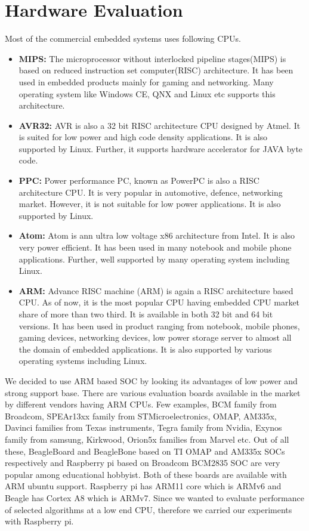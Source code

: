 \section {Hardware Evaluation}
\indent Most of the commercial embedded systems uses following CPUs.
\begin{itemize}
	\item \textbf{MIPS:} The microprocessor without interlocked
		pipeline stages(MIPS) is based on reduced instruction
		set computer(RISC) architecture. It has been used in
		embedded products mainly for gaming and networking. Many
		operating system like Windows CE, QNX and Linux etc
		supports this architecture.
	\item \textbf{AVR32:} AVR is also a 32 bit RISC architecture CPU
		designed by Atmel. It is suited for low power and high
		code density applications.  It is also supported by
		Linux. Further, it supports hardware accelerator for
		JAVA byte code.
	\item \textbf{PPC:} Power performance PC, known as PowerPC is
		also a RISC architecture CPU. It is very popular in
		automotive, defence, networking market. However, it is not
		suitable for low power applications. It is also
		supported by Linux.
	\item \textbf{Atom:} Atom is ann ultra low voltage x86
		architecture from Intel. It is also very power
		efficient. It has been used in many notebook and mobile
		phone applications. Further, well supported by many
		operating system including Linux.
	\item \textbf{ARM:} Advance RISC machine (ARM) is again a RISC
		architecture based CPU. As of now, it is the most
		popular CPU having embedded CPU market share of more
		than two third. It is available in both 32 bit and 64
		bit versions. It has been used in product ranging from
		notebook, mobile phones, gaming devices, networking
		devices, low power storage server to almost all the
		domain of embedded applications. It is also supported by
		various operating systems including Linux.
\end{itemize}
We decided to use ARM based SOC by looking its advantages of low power
and strong support base. There are various evaluation boards available
in the market by different vendors having ARM CPUs. Few examples, BCM
family from Broadcom, SPEAr13xx family from STMicroelectronics, OMAP,
AM335x, Davinci families from Texas instruments, Tegra family from
Nvidia, Exynos family from samsung, Kirkwood, Orion5x families from
Marvel etc. Out of all these, BeagleBoard and BeagleBone based on TI
OMAP and AM335x SOCs respectively and Raspberry pi based on Broadcom
BCM2835 SOC are very popular among educational hobbyist. Both of these
boards are available with ARM ubuntu support. Raspberry pi has ARM11
core which is ARMv6 and Beagle has Cortex A8 which is ARMv7. Since we
wanted to evaluate performance of selected algorithms at a low end CPU,
therefore we carried our experiments with Raspberry pi.

